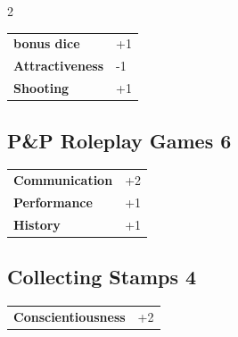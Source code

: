 \begin{multicols}{2}
\begin{tcolorbox}
\begin{tabular}{@{}ll@{}}
    \textbf{bonus dice} & +1\\
    \textbf{Attractiveness} & -1\\
    \textbf{Shooting} & +1\\
\end{tabular}


\end{tcolorbox}

\begin{tcolorbox}
    \subsection*{P\&P Roleplay Games \hfill \small{6 }}
    \tcblower




\begin{tabular}{@{}ll@{}}
    \textbf{Communication} & +2\\
    \textbf{Performance} & +1\\
    \textbf{History} & +1\\
\end{tabular}


\end{tcolorbox}

\begin{tcolorbox}
    \subsection*{Collecting Stamps \hfill \small{4 }}
    \tcblower




\begin{tabular}{@{}ll@{}}
    \textbf{Conscientiousness} & +2\\
\end{tabular}



\end{tcolorbox}
\end{multicols}

